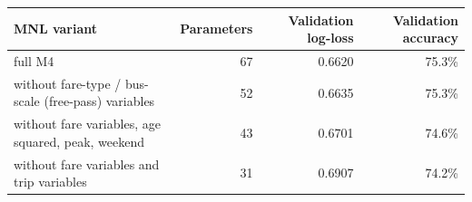 \begin{tabular}{lrrr}
\toprule
MNL variant & Parameters & Validation log-loss & Validation accuracy \\
\midrule
full M4 & 67 & 0.6620 & 75.3\% \\
without fare-type / bus-scale (free-pass) variables & 52 & 0.6635 & 75.3\% \\
without fare variables, age squared, peak, weekend & 43 & 0.6701 & 74.6\% \\
without fare variables and trip variables & 31 & 0.6907 & 74.2\% \\
\bottomrule
\end{tabular}
